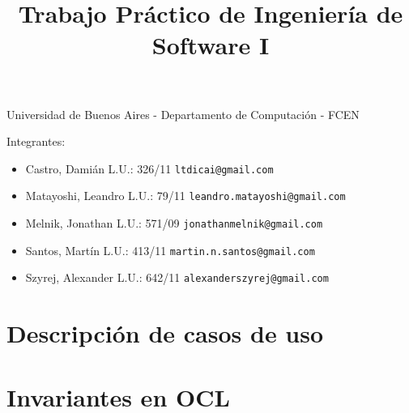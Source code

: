 \documentclass[a4paper,11pt]{article}
\title{Trabajo Práctico de Ingeniería de Software I}
\begin{document}
\maketitle

\begin{center}
	Universidad de Buenos Aires - Departamento de Computaci\'on - FCEN
\end{center}

\vspace{2cm}
Integrantes:

\begin{itemize}
	\item Castro, Dami\'an L.U.: 326/11  \verb+ltdicai@gmail.com+
	\item Matayoshi, Leandro L.U.: 79/11 \verb+leandro.matayoshi@gmail.com+
	\item Melnik, Jonathan L.U.: 571/09 \verb+jonathanmelnik@gmail.com+
	\item Santos, Martín L.U.: 413/11 \verb+martin.n.santos@gmail.com+
	\item Szyrej, Alexander L.U.: 642/11   \verb+alexanderszyrej@gmail.com+
	
\end{itemize}

\newpage

\tableofcontents

\newpage

\section{Descripción de casos de uso}




\section{Invariantes en OCL}


\end{document}

